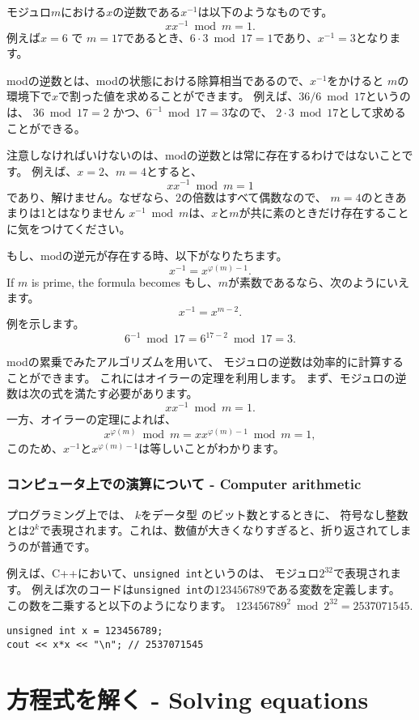 モジュロ$m$における$x$の逆数である$x^{-1}$は以下のようなものです。
\[ x x^{-1} \bmod m = 1. \]
例えば$x=6$ で $m=17$であるとき、$6\cdot3 \bmod 17=1$であり、$x^{-1}=3$となります。

modの逆数とは、modの状態における除算相当であるので、$x^{-1}$をかけると
$m$の環境下で$x$で割った値を求めることができます。
例えば、$36/6 \bmod 17$というのは、
$36 \bmod 17 = 2$ かつ、$6^{-1} \bmod 17 = 3$なので、
$2 \cdot 3 \bmod 17$として求めることができる。

注意しなければいけないのは、modの逆数とは常に存在するわけではないことです。
例えば、$x=2$、$m=4$とすると、
\[ x x^{-1} \bmod m = 1 \]
であり、解けません。なぜなら、2の倍数はすべて偶数なので、
$m = 4$のときあまりは1とはなりません
 $x^{-1} \bmod m$は、$x$と$m$が共に素のときだけ存在することに気をつけてください。

もし、modの逆元が存在する時、以下がなりたちます。
\[
x^{-1} = x^{\varphi(m)-1}.
\]
If $m$ is prime, the formula becomes
もし、$m$が素数であるなら、次のようにいえます。
\[
x^{-1} = x^{m-2}.
\]
例を示します。
\[6^{-1} \bmod 17 =6^{17-2} \bmod 17 = 3.\]

modの累乗でみたアルゴリズムを用いて、
モジュロの逆数は効率的に計算することができます。
これにはオイラーの定理を利用します。
まず、モジュロの逆数は次の式を満たす必要があります。
\[
x x^{-1} \bmod m = 1.
\]
一方、オイラーの定理によれば、
\[
x^{\varphi(m)} \bmod m =  xx^{\varphi(m)-1} \bmod m = 1,
\]
このため、$x^{-1}$と$x^{\varphi(m)-1}$は等しいことがわかります。

\subsubsection{コンピュータ上での演算について - Computer arithmetic}

プログラミング上では、
$k$をデータ型 のビット数とするときに、
符号なし整数とは$2^k$で表現されます。これは、数値が大きくなりすぎると、折り返されてしまうのが普通です。

例えば、C++において、\texttt{unsigned int}というのは、
モジュロ$2^{32}$で表現されます。
例えば次のコードは\texttt{unsigned int}の$123456789$である変数を定義します。
この数を二乗すると以下のようになります。
$123456789^2 \bmod 2^{32} = 2537071545$.

\begin{lstlisting}
unsigned int x = 123456789;
cout << x*x << "\n"; // 2537071545
\end{lstlisting}

\section{方程式を解く - Solving equations}

